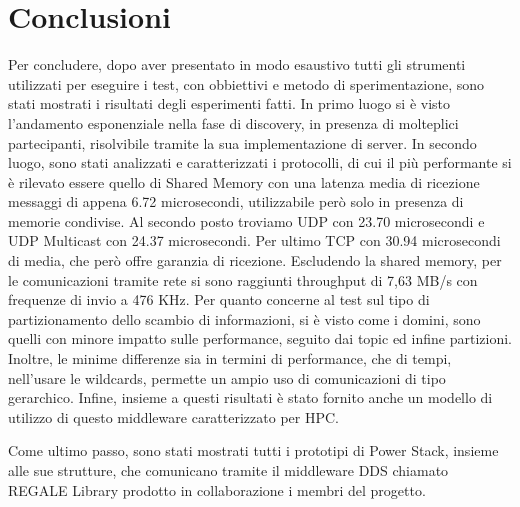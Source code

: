 \chapter{Conclusioni}
Per concludere, dopo aver presentato in modo esaustivo tutti gli strumenti utilizzati per eseguire i test, con obbiettivi e metodo di sperimentazione, sono stati mostrati i risultati degli esperimenti fatti. 
In primo luogo si è visto l'andamento esponenziale nella fase di discovery, in presenza di molteplici partecipanti, risolvibile tramite la sua implementazione di server.
In secondo luogo, sono stati analizzati e caratterizzati i protocolli, di cui il più performante si è rilevato essere quello di Shared Memory con una latenza media di ricezione messaggi di appena 6.72 microsecondi, utilizzabile però solo in presenza di memorie condivise.
Al secondo posto troviamo UDP con 23.70 microsecondi e UDP Multicast con 24.37 microsecondi. Per ultimo TCP con 30.94 microsecondi di media, che però offre garanzia di ricezione. Escludendo la shared memory, per le comunicazioni tramite rete si sono raggiunti throughput di 7,63 MB/s con frequenze di invio a 476 KHz.
Per quanto concerne al test sul tipo di partizionamento dello scambio di informazioni, si è visto come i domini, sono quelli con minore impatto sulle performance, seguito dai topic ed infine partizioni. Inoltre, le minime differenze sia in termini di performance, che di tempi, nell'usare le wildcards, permette un ampio uso di comunicazioni di tipo gerarchico.
Infine, insieme a questi risultati è stato fornito anche un modello di utilizzo di questo middleware caratterizzato per HPC.

Come ultimo passo, sono stati mostrati tutti i prototipi di Power Stack, insieme alle sue strutture, che comunicano tramite il middleware DDS chiamato REGALE Library prodotto in collaborazione i membri del progetto.
